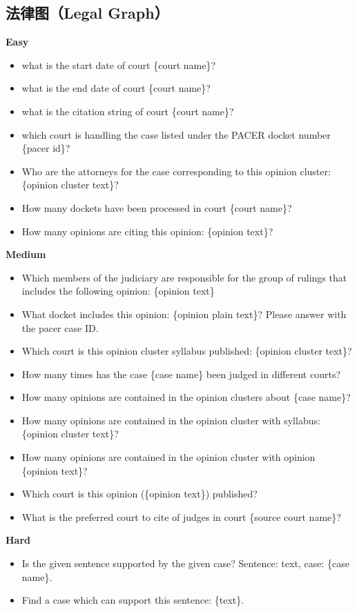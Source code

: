 \documentclass[11pt,UTF8,fontset=fandol]{ctexart}
\begin{document}
\subsection*{法律图（Legal Graph）}
\noindent\textbf{Easy}
\begin{itemize}[leftmargin=1.4em,nosep]
\item what is the start date of court \{court name\}?
\item what is the end date of court \{court name\}?
\item what is the citation string of court \{court name\}?
\item which court is handling the case listed under the PACER docket number \{pacer id\}?
\item Who are the attorneys for the case corresponding to this opinion cluster: \{opinion cluster text\}?
\item How many dockets have been processed in court \{court name\}?
\item How many opinions are citing this opinion: \{opinion text\}?
\end{itemize}
\noindent\textbf{Medium}
\begin{itemize}[leftmargin=1.4em,nosep]
\item Which members of the judiciary are responsible for the group of rulings that includes the following opinion: \{opinion text\}
\item What docket includes this opinion: \{opinion plain text\}? Please answer with the pacer case ID.
\item Which court is this opinion cluster syllabus published: \{opinion cluster text\}?
\item How many times has the case \{case name\} been judged in different courts?
\item How many opinions are contained in the opinion clusters about \{case name\}?
\item How many opinions are contained in the opinion cluster with syllabus: \{opinion cluster text\}?
\item How many opinions are contained in the opinion cluster with opinion \{opinion text\}?
\item Which court is this opinion (\{opinion text\}) published?
\item What is the preferred court to cite of judges in court \{source court name\}?
\end{itemize}
\noindent\textbf{Hard}
\begin{itemize}[leftmargin=1.4em,nosep]
\item Is the given sentence supported by the given case? Sentence: text, case: \{case name\}.
\item Find a case which can support this sentence: \{text\}.
\end{itemize}
\end{document}
